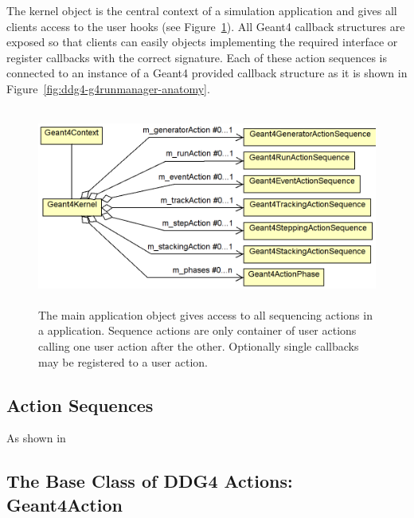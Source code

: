 \documentclass[10pt,a4paper]{article}
\begin{document}
\noindent
The kernel object is the central context of a \DDG simulation application and
gives all clients access to the user hooks (see Figure~\ref{fig:ddg4-geant4-kernel}).
All Geant4 callback structures are exposed so that clients can easily 
objects implementing the required interface or register callbacks with the 
correct signature. Each of these action sequences is connected to an instance
of a Geant4 provided callback structure as it is shown in
Figure~\ref{fig:ddg4-g4runmanager-anatomy}.
\begin{figure}[h]
  \begin{center}
    \includegraphics[height=65mm] {DDG4-Geant4Kernel.png}
    \caption{The main application object gives access to all sequencing actions
    in a  application. Sequence actions are only container of user actions
    calling one user action after the other. Optionally single callbacks may 
    be registered to a user action.}
    \label{fig:ddg4-geant4-kernel}
  \end{center}
\end{figure}

\subsection{Action Sequences}
\label{sec:ddg4-user-manual-implementation-geant4action-sequences}

\noindent
As shown in 

\subsection{The Base Class of DDG4 Actions: Geant4Action}
\label{sec:ddg4-user-manual-implementation-geant4action-base}
\end{document}
